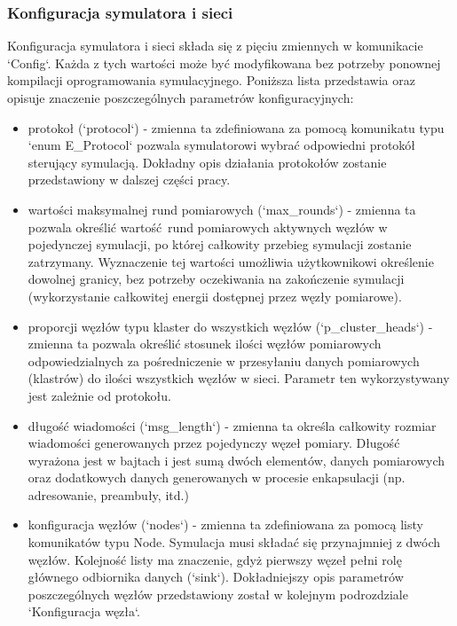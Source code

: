 \documentclass[a4paper,12pt,twoside,openany]{report}
\begin{document}
\subsubsection{Konfiguracja symulatora i sieci}

Konfiguracja symulatora i sieci składa się z pięciu zmiennych w komunikacie `Config`. Każda z tych wartości może być modyfikowana bez potrzeby
ponownej kompilacji oprogramowania symulacyjnego. Poniższa lista przedstawia oraz opisuje znaczenie poszczególnych parametrów konfiguracyjnych:

\begin{itemize}
 \item protokoł (`protocol`) - zmienna ta zdefiniowana za pomocą komunikatu typu `enum E\_Protocol` pozwala symulatorowi wybrać odpowiedni 
       protokół sterujący symulacją. Dokładny opis działania protokołów zostanie przedstawiony w dalszej części pracy.
 \item wartości maksymalnej rund pomiarowych (`max\_rounds`) - zmienna ta pozwala określić wartość rund pomiarowych aktywnych węzłów w pojedynczej symulacji, 
       po której całkowity przebieg symulacji zostanie zatrzymany.
       Wyznaczenie tej wartości umożliwia użytkownikowi określenie dowolnej granicy, bez potrzeby oczekiwania na zakończenie symulacji (wykorzystanie 
       całkowitej energii dostępnej przez węzły pomiarowe).
 \item proporcji węzłów typu klaster do wszystkich węzłów (`p\_cluster\_heads`) - zmienna ta pozwala określić stosunek ilości węzłów pomiarowych 
       odpowiedzialnych za pośredniczenie w przesyłaniu danych pomiarowych (klastrów) do ilości wszystkich węzłów w sieci. Parametr ten wykorzystywany jest
       zależnie od protokołu.
 \item długość wiadomości (`msg\_length`) - zmienna ta określa całkowity rozmiar wiadomości generowanych przez pojedynczy węzeł pomiary.
       Długość wyrażona jest w bajtach i jest sumą dwóch elementów, danych pomiarowych oraz dodatkowych danych generowanych w procesie enkapsulacji
       (np. adresowanie, preambuły, itd.)
 \item konfiguracja węzłów (`nodes`) - zmienna ta zdefiniowana za pomocą listy komunikatów typu Node. Symulacja musi składać się przynajmniej z dwóch węzłów.
       Kolejność listy ma znaczenie, gdyż pierwszy węzeł pełni rolę głównego odbiornika danych (`sink`).
       Dokładniejszy opis parametrów poszczególnych węzłów przedstawiony został w kolejnym podrozdziale `Konfiguracja węzła`. 
\end{itemize}
\end{document}
